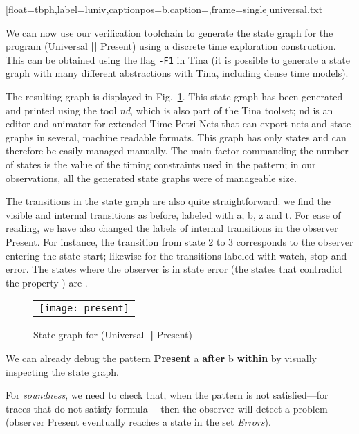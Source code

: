 \documentclass[a4paper]{scrartcl}
\def\code#1{\textsf{\small\bfseries #1}}
\def\vars#1{\textsf{\small #1}}
\begin{document}
{
  [float=tbph,label=luniv,captionpos=b,caption=,frame=single]{universal.txt}}


We can now use our verification toolchain to generate the state graph
for the program (\vars{Universal} \code{||} \vars{Present}) using a
discrete time exploration construction. This can be obtained using the
flag \texttt{-F1} in {Tina} (it is possible to generate a state
graph with many different abstractions with Tina, including dense time
models).

The resulting graph is displayed in Fig.~\ref{fig:example}.  This
state graph has been generated and printed using the tool \emph{nd},
which is also part of the Tina toolset; nd is an editor and animator
for extended Time Petri Nets that can export nets and state graphs in
several, machine readable formats. This graph has only  states and
can therefore be easily managed manually. The main factor commanding
the number of states is the value of the timing constraints used in
the pattern; in our observations, all the generated state graphs were
of manageable size.

The transitions in the state graph are also quite straightforward: we
find the visible and internal transitions as before, labeled with
\vars{a}, \vars{b}, \vars{z} and \vars{t}. For ease of reading, we
have also changed the labels of internal transitions in the observer
\vars{Present}. For instance, the transition from state 2 to 3
corresponds to the observer entering the state \vars{start}; likewise
for the transitions labeled with \vars{watch}, \vars{stop} and
\vars{error}. The states where the observer is in state \vars{error}
(the states that contradict the property ) are .

\begin{figure}[ht]
\centering
\begin{tabular}[c]{l}
\texttt{[image: present]}\\
\end{tabular}
\caption{State graph for (\vars{Universal} \code{||} \vars{Present})}
\label{fig:example}
\end{figure}

We can already debug the pattern \code{Present} \vars{a} \code{after}
\vars{b} \code{within}  by visually inspecting the state
graph.

For \emph{soundness}, we need to check that, when the pattern is not
satisfied---for traces  that do not satisfy formula
---then the observer will detect a problem (observer
\vars{Present} eventually reaches a state in the set \emph{Errors}).
\end{document}
